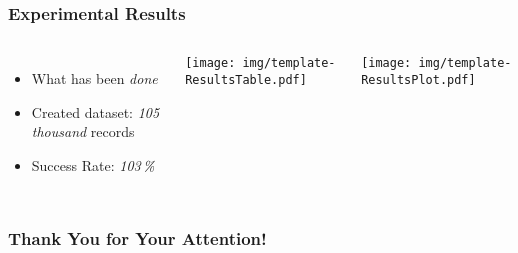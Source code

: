 \begin{frame}
  \frametitle{Experimental Results}
  \begin{columns}
    \begin{itemize}
      \item What has been \emph{done}
      \item Created dataset: \emph{105\,thousand} records
      \item Success Rate: \emph{103\,\%}
    \end{itemize}
    
    \centering
    \texttt{[image: img/template-ResultsTable.pdf]}
    
    \bigskip
    \texttt{[image: img/template-ResultsPlot.pdf]}
    
  \end{columns}
\end{frame}





\begin{frame}
  \frametitle{Thank You for Your Attention!}
  \centering
\end{frame}


